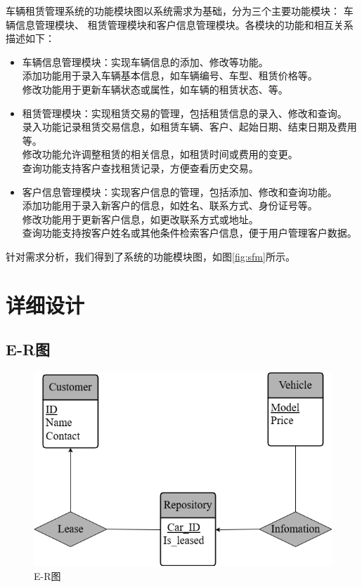 \documentclass[UTF8,a4paper,12pt]{ctexart}
\begin{document}
车辆租赁管理系统的功能模块图以系统需求为基础，分为三个主要功能模块：
车辆信息管理模块、
租赁管理模块和客户信息管理模块。各模块的功能和相互关系描述如下：

\begin{itemize}
    \item 车辆信息管理模块：实现车辆信息的添加、修改等功能。\\
    添加功能用于录入车辆基本信息，如车辆编号、车型、租赁价格等。\\
    修改功能用于更新车辆状态或属性，如车辆的租赁状态、等。
    \item 租赁管理模块：实现租赁交易的管理，包括租赁信息的录入、修改和查询。\\
    录入功能记录租赁交易信息，如租赁车辆、客户、起始日期、结束日期及费用等。\\
    修改功能允许调整租赁的相关信息，如租赁时间或费用的变更。\\
    查询功能支持客户查找租赁记录，方便查看历史交易。
    \item 客户信息管理模块：实现客户信息的管理，包括添加、修改和查询功能。\\
    添加功能用于录入新客户的信息，如姓名、联系方式、身份证号等。\\
    修改功能用于更新客户信息，如更改联系方式或地址。\\
    查询功能支持按客户姓名或其他条件检索客户信息，便于用户管理客户数据。\\
\end{itemize}
\vspace{-0.8cm}
针对需求分析，我们得到了系统的功能模块图，如图\ref{fig:sfm}所示。

\section{详细设计}

\subsection{E-R图}

\begin{figure}[htbp]  %
    \centering  %
    \includegraphics[width=1\textwidth]{pic/er.png}  %
    \caption{E-R图}  %
    \label{fig:er}  %
\end{figure}
\end{document}
